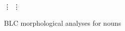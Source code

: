 {\begin{description}
\begin{figure}[t]
\begin{mdframed}
\begin{tabbing}
\vdots \> \vdots \\
\end{tabbing}
\label{fig:blc-nouns}
\caption{BLC morphological analyses for nouns}
\end{mdframed}
\end{figure}
   

\end{description}}
